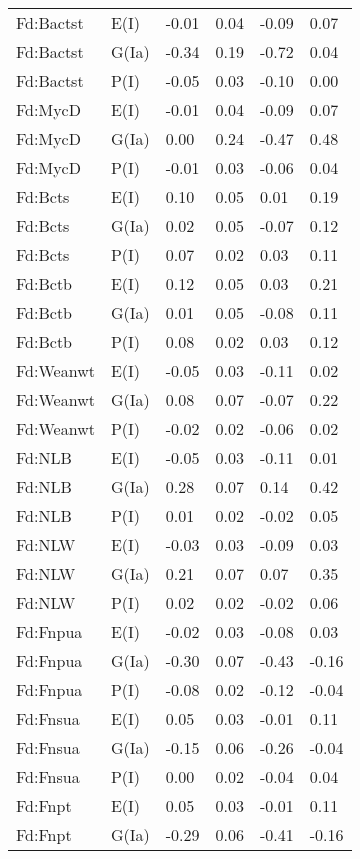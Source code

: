 \begin{center}
\begin{longtable}{|p{1.1in}|p{0.7in}|p{0.7in}|p{0.6in}|p{0.6in}|p{0.6in}|}
  Fd:Bactst & E(I) & -0.01 & 0.04 & -0.09 & 0.07 \\ 
  Fd:Bactst & G(Ia) & -0.34 & 0.19 & -0.72 & 0.04 \\ 
  Fd:Bactst & P(I) & -0.05 & 0.03 & -0.10 & 0.00 \\ 
  Fd:MycD & E(I) & -0.01 & 0.04 & -0.09 & 0.07 \\ 
  Fd:MycD & G(Ia) & 0.00 & 0.24 & -0.47 & 0.48 \\ 
  Fd:MycD & P(I) & -0.01 & 0.03 & -0.06 & 0.04 \\ 
  Fd:Bcts & E(I) & 0.10 & 0.05 & 0.01 & 0.19 \\ 
  Fd:Bcts & G(Ia) & 0.02 & 0.05 & -0.07 & 0.12 \\ 
  Fd:Bcts & P(I) & 0.07 & 0.02 & 0.03 & 0.11 \\ 
  Fd:Bctb & E(I) & 0.12 & 0.05 & 0.03 & 0.21 \\ 
  Fd:Bctb & G(Ia) & 0.01 & 0.05 & -0.08 & 0.11 \\ 
  Fd:Bctb & P(I) & 0.08 & 0.02 & 0.03 & 0.12 \\ 
  Fd:Weanwt & E(I) & -0.05 & 0.03 & -0.11 & 0.02 \\ 
  Fd:Weanwt & G(Ia) & 0.08 & 0.07 & -0.07 & 0.22 \\ 
  Fd:Weanwt & P(I) & -0.02 & 0.02 & -0.06 & 0.02 \\ 
  Fd:NLB & E(I) & -0.05 & 0.03 & -0.11 & 0.01 \\ 
  Fd:NLB & G(Ia) & 0.28 & 0.07 & 0.14 & 0.42 \\ 
  Fd:NLB & P(I) & 0.01 & 0.02 & -0.02 & 0.05 \\ 
  Fd:NLW & E(I) & -0.03 & 0.03 & -0.09 & 0.03 \\ 
  Fd:NLW & G(Ia) & 0.21 & 0.07 & 0.07 & 0.35 \\ 
  Fd:NLW & P(I) & 0.02 & 0.02 & -0.02 & 0.06 \\ 
  Fd:Fnpua & E(I) & -0.02 & 0.03 & -0.08 & 0.03 \\ 
  Fd:Fnpua & G(Ia) & -0.30 & 0.07 & -0.43 & -0.16 \\ 
  Fd:Fnpua & P(I) & -0.08 & 0.02 & -0.12 & -0.04 \\ 
  Fd:Fnsua & E(I) & 0.05 & 0.03 & -0.01 & 0.11 \\ 
  Fd:Fnsua & G(Ia) & -0.15 & 0.06 & -0.26 & -0.04 \\ 
  Fd:Fnsua & P(I) & 0.00 & 0.02 & -0.04 & 0.04 \\ 
  Fd:Fnpt & E(I) & 0.05 & 0.03 & -0.01 & 0.11 \\ 
  Fd:Fnpt & G(Ia) & -0.29 & 0.06 & -0.41 & -0.16 \\ 

\end{longtable}
\end{center}
